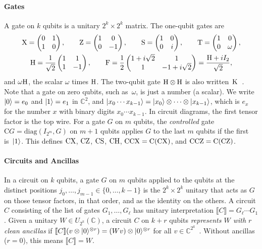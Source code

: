 \documentclass[acmsmall,screen,nonacm]{acmart}
\begin{document}
\paragraph{Gates} A gate on $k$ qubits is a unitary $2^k\times2^k$ matrix. The one-qubit gates are~\cite[Section~4]{amy2020numbertheoretic}
\begin{gather*}
\mathrm{X}=\begin{pmatrix}0&1\\1&0\end{pmatrix},\qquad
\mathrm{Z}=\begin{pmatrix}1&0\\0&-1\end{pmatrix},\qquad
\mathrm{S}=\begin{pmatrix}1&0\\0&i\end{pmatrix},\qquad
\mathrm{T}=\begin{pmatrix}1&0\\0&\omega\end{pmatrix},\\
\mathrm{H}=\frac{1}{\sqrt2}\begin{pmatrix}1&1\\1&-1\end{pmatrix},\qquad
\mathrm{F}=\frac12\begin{pmatrix}1+i\sqrt2&1\\1&-1+i\sqrt2\end{pmatrix}=\frac{\mathrm{H}+iI_2}{\sqrt2},
\end{gather*}
and $\omega\mathrm{H}$, the scalar $\omega$ times $\mathrm{H}$. The two-qubit gate $\mathrm{H}\otimes\mathrm{H}$ is also written~$\mathrm{K}$~\cite[Definition~2.4]{li2021on}. 
Note that a gate on zero qubits, such as~$\omega$, is just a number (a scalar). We write $|0\rangle=e_0$ and $|1\rangle=e_1$ in $\mathbb C^2$, and $|x_0\cdots x_{k-1}\rangle=|x_0\rangle\otimes\cdots\otimes|x_{k-1}\rangle$, which is $e_x$ for the number $x$ with binary digits $x_0\cdots x_{k-1}$. In circuit diagrams, the first tensor factor is the top wire. 
For a gate $G$ on $m$ qubits, the \emph{controlled} gate $\mathrm CG=\mathrm{diag}(I_{2^m},G)$ on $m+1$ qubits applies $G$ to the last $m$ qubits if the first is~$|1\rangle$. This defines $\mathrm{CX}$, $\mathrm{CZ}$, $\mathrm{CS}$, $\mathrm{CH}$, $\mathrm{CCX}=\mathrm C(\mathrm{CX})$, and $\mathrm{CCZ}=\mathrm C(\mathrm{CZ})$.

\paragraph{Circuits and Ancillas} In a circuit on $k$ qubits, a gate $G$ on $m$ qubits applied to the qubits at the distinct positions $j_0,\dots,j_{m-1}\in\{0,\dots,k-1\}$ is the $2^k\times2^k$ unitary that acts as $G$ on those tensor factors, in that order, and as the identity on the others.
A circuit $C$ consisting of the list of gates $G_1,\dots,G_\ell$ has unitary interpretation $\llbracket C\rrbracket=G_\ell\cdots G_1$. 
Given a unitary $W\in U_{2^k}(\mathbb C)$, a circuit $C$ on $k+r$ qubits \emph{represents $W$ with $r$ clean ancillas} if $\llbracket C\rrbracket(v\otimes|0\rangle^{\otimes r})=(Wv)\otimes|0\rangle^{\otimes r}$ for all $v\in\mathbb C^{2^k}$~\cite{giles2013exact,amy2020numbertheoretic}. Without ancillas ($r=0$), this means $\llbracket C\rrbracket=W$.
\end{document}
